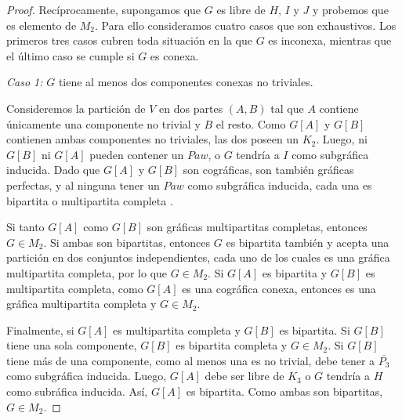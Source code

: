 \begin{proof}
  Recíprocamente, supongamos que $G$ es libre de $H$, $I$ y $J$ y probemos
  que es elemento de $M_2$. Para ello consideramos
  cuatro casos que son exhaustivos. Los primeros tres casos cubren toda
  situación en la que $G$ es inconexa, mientras que el último caso se cumple
  si $G$ es conexa.

  \emph{Caso 1:} $G$ tiene al menos dos componentes conexas no triviales.

  Consideremos la partición de $V$ en dos partes $(A,B)$ tal que $A$ contiene
  únicamente una componente no trivial y $B$ el resto. Como $G[A]$ y $G[B]$
  contienen ambas componentes no triviales, las dos poseen un $K_2$. Luego,
  ni $G[B]$ ni $G[A]$ pueden contener un $Paw$, o $G$ tendría a $I$ como
  subgráfica inducida. Dado que $G[A]$ y $G[B]$ son cográficas, son también
  gráficas perfectas, y al ninguna tener un $Paw$ como subgráfica inducida,
  cada una es bipartita o multipartita completa \cite{Olariu}.


  Si tanto $G[A]$ como $G[B]$ son gráficas multipartitas completas,
  entonces $G \in M_2$. Si ambas son bipartitas, entonces $G$ es bipartita
  también y acepta una partición en dos conjuntos independientes, cada uno
  de los cuales es una gráfica multipartita completa, por lo que $G \in M_2$.
  Si $G[A]$ es bipartita y $G[B]$ es multipartita completa, como $G[A]$ es
  una cográfica conexa, entonces es una gráfica multipartita completa y $G
  \in M_2$.


  Finalmente, si $G[A]$ es multipartita completa y $G[B]$ es bipartita. Si
  $G[B]$ tiene una sola componente, $G[B]$ es bipartita completa y $G \in
  M_2$. Si $G[B]$ tiene más de una componente, como al menos una es no
  trivial, debe tener a $\overline{P_3}$ como subgráfica inducida. Luego,
  $G[A]$ debe ser libre de $K_3$ o $G$ tendría a $H$ como subráfica inducida.
  Así, $G[A]$ es bipartita. Como ambas son bipartitas, $G \in M_2$.



\end{proof}

